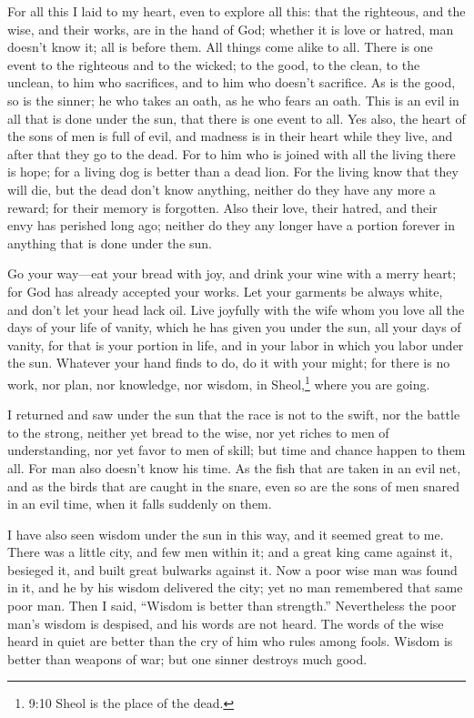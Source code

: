 \mychapter{} \myverse*{}For all this I laid to my heart, even to explore all this: that
the righteous, and the wise, and their works, are in the hand of God; whether it is love or hatred, man
doesn’t know it; all is before them.
\myverse{}All things come alike to all. There is one event to the righteous and to the
wicked; to the good, to the clean, to the unclean, to him who sacrifices, and to him who doesn’t sacrifice.
As is the good, so is the sinner; he who takes an oath, as he who fears an oath.
\myverse{}This is an evil in all that is done under the sun, that there is one event to
all. Yes also, the heart of the sons of men is full of evil, and madness is in their heart while they
live, and after that they go to the dead.
\myverse{}For to him who is joined with all the living there is hope; for a living dog
is better than a dead lion.
\myverse{}For the living know that they will die, but the dead don’t know anything, neither
do they have any more a reward; for their memory is forgotten.
\myverse{}Also their love, their hatred, and their envy has perished long ago; neither
do they any longer have a portion forever in anything that is done under the sun.

\myverse{}Go your way—eat your bread with joy, and drink your wine with a
merry heart; for God has already accepted your works.
\myverse{}Let your garments be always white, and don’t let your head lack oil.
\myverse{}Live joyfully with the wife whom you love all the days of your life of vanity,
which he has given you under the sun, all your days of vanity, for that is your portion in life, and in
your labor in which you labor under the sun.
\myverse{}Whatever your hand finds to do, do it with your might; for there is no work,
nor plan, nor knowledge, nor wisdom, in Sheol,\footnote{9:10 Sheol is the place of the dead.} where you are going.

\myverse{}I returned and saw under the sun that the race is not to the
swift, nor the battle to the strong, neither yet bread to the wise, nor yet riches to men of understanding,
nor yet favor to men of skill; but time and chance happen to them all.
\myverse{}For man also doesn’t know his time. As the fish that are taken in an evil
net, and as the birds that are caught in the snare, even so are the sons of men snared in an evil time,
when it falls suddenly on them.

\myverse{}I have also seen wisdom under the sun in this way, and it seemed
great to me.
\myverse{}There was a little city, and few men within it; and a great king came against
it, besieged it, and built great bulwarks against it.
\myverse{}Now a poor wise man was found in it, and he by his wisdom delivered the city;
yet no man remembered that same poor man.
\myverse{}Then I said, “Wisdom is better than strength.” Nevertheless the poor man’s
wisdom is despised, and his words are not heard.
\myverse{}The words of the wise heard in quiet are better than the cry of him who rules
among fools.
\myverse{}Wisdom is better than weapons of war; but one sinner destroys much good.


